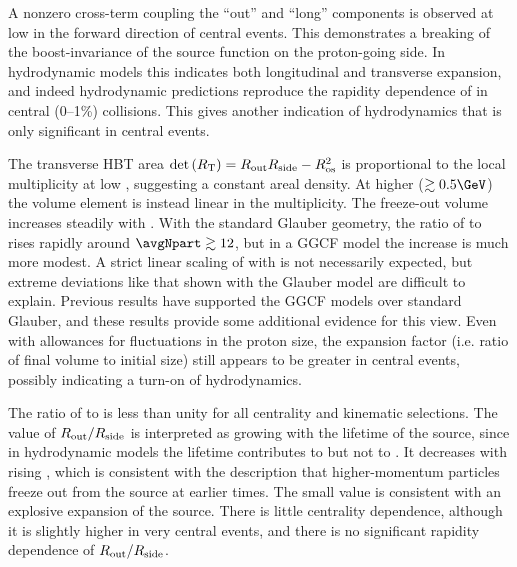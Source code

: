 A nonzero cross-term \Rol coupling the ``out'' and ``long'' components is observed at low \kt in the forward direction of central events.
This demonstrates a breaking of the boost-invariance of the source function on the proton-going side.
In hydrodynamic models this indicates both longitudinal and transverse expansion, and indeed hydrodynamic predictions reproduce the rapidity dependence of \Rol in central (0--1\%) collisions.
This gives another indication of hydrodynamics that is only significant in central events.

The transverse \ac{HBT} area $\mathrm{det}\left(R_\mathrm{T}\right) = R_{\mathrm{out}} R_{\mathrm{side}} - R_{\mathrm{os}}^2$ is proportional to the local multiplicity \dNdy at low \kt, suggesting a constant areal density.
At higher \kt ($\gtrsim 0.5 \GeV$) the volume element \detR is instead linear in the multiplicity.
The freeze-out volume increases steadily with \avgNpart.
With the standard Glauber geometry, the ratio of \detR to \Npart rises rapidly around $\avgNpart \gtrsim 12$, but in a \ac{GGCF} model the increase is much more modest.
A strict linear scaling of \detR with \avgNpart is not necessarily expected, but extreme deviations like that shown with the Glauber model are difficult to explain.
Previous results have supported the \ac{GGCF} models over standard Glauber, and these results provide some additional evidence for this view.
Even with allowances for fluctuations in the proton size, the expansion factor (i.e. ratio of final volume to initial size) still appears to be greater in central events, possibly indicating a turn-on of hydrodynamics.

The ratio of \Rout to \Rside is less than unity for all centrality and kinematic selections.
The value of $R_{\mathrm{out}}/R_{\mathrm{side}}$ is interpreted as growing with the lifetime of the source, since in hydrodynamic models the lifetime contributes to \Rout but not to \Rside.
It decreases with rising \kt, which is consistent with the description that higher-momentum particles freeze out from the source at earlier times.
The small value is consistent with an explosive expansion of the source.
There is little centrality dependence, although it is slightly higher in very central events, and there is no significant rapidity dependence of $R_{\mathrm{out}}/R_{\mathrm{side}}$.

